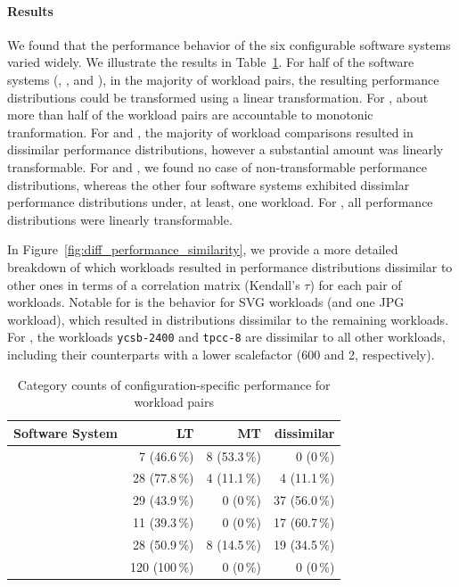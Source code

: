 \paragraph*{Results}
We found that the performance behavior of the six configurable software systems varied widely. We illustrate the results in Table~\ref{tab:categorization}. For half of the software systems (\kanzi, \batik, and \jadx), in the majority of workload pairs, the resulting performance distributions could be transformed using a linear transformation. For \jumper, about more than half of the workload pairs are accountable to monotonic tranformation. For \dconvert and \htwo, the majority of workload comparisons resulted in dissimilar performance distributions, however a substantial amount was linearly transformable. For \jumper and \jadx, we found no case of non-transformable performance distributions, whereas the other four software systems exhibited dissimlar performance distributions under, at least, one workload. For \jadx, all performance distributions were linearly transformable.

In Figure~\ref{fig:diff_performance_similarity}, we provide a more detailed breakdown of which workloads resulted in performance distributions dissimilar to other ones in terms of a correlation matrix (Kendall's $\tau$) for each pair of workloads. Notable for \dconvert is the behavior for SVG workloads (and one JPG workload), which resulted in distributions dissimilar to the remaining workloads. For \htwo, the workloads \texttt{ycsb-2400} and \texttt{tpcc-8} are dissimilar to all other workloads, including their counterparts with a lower scalefactor (600 and 2, respectively).

\begin{table}
	\caption{Category counts of configuration-specific performance for workload pairs}
	\begin{tabular}{p{2.4cm}rrr}
		\toprule
		\textbf{Software System} & \textbf{LT} & \textbf{MT} & \textbf{dissimilar}\\
		\midrule
		\jumper &  7 (46.6\,\%) & \cellcolor{nicegreen!20}8 (53.3\,\%)& 0 (0\,\%)\\
		\kanzi &  \cellcolor{nicegreen!20}28 (77.8\,\%)& 4 (11.1\,\%) & 4 (11.1\,\%)\\
		\dconvert &  29 (43.9\,\%) & 0 (0\,\%) & \cellcolor{nicegreen!20}37 (56.0\,\%)\\
		\htwo &  11 (39.3\,\%) & 0 (0\,\%) & \cellcolor{nicegreen!20}17 (60.7\,\%)\\
		\batik &  \cellcolor{nicegreen!20}28 (50.9\,\%) & 8 (14.5\,\%) & 19 (34.5\,\%)\\
		\jadx  &  \cellcolor{nicegreen!20}120 (100\,\%) & 0 (0\,\%) & 0 (0\,\%)\\
		\bottomrule
	\end{tabular}
	\label{tab:categorization}
\end{table}

